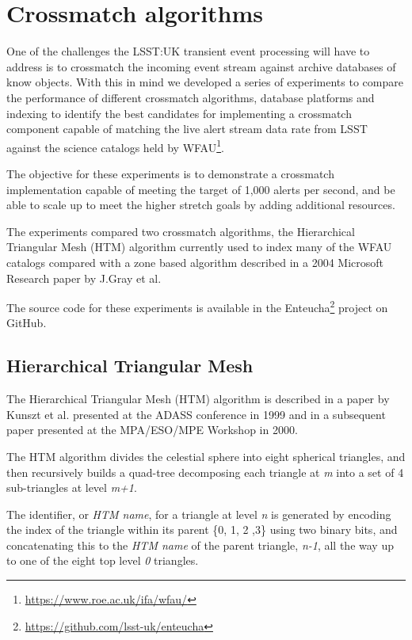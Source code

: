 \documentclass{article}
\newcommand{\enteucha} {Enteucha\xspace}
\newcommand{\github} {GitHub\xspace}
\newcommand{\crossmatch} {crossmatch\xspace}
\newcommand{\catalogs} {catalogs\xspace}
\newcommand{\lsst} {LSST\xspace}
\newcommand{\lsstuk} {LSST:UK\xspace}
\newcommand{\wfau} {WFAU\xspace}
\newcommand{\footurl}[1] {\footnote{\url{#1}}}
\begin{document}
\section{Crossmatch algorithms}
\label{crossmatch-algorithms}

One of the challenges the \lsstuk transient event processing will have to address is to \crossmatch the incoming event stream against archive databases of know objects. With this in mind we developed a series of experiments to compare the performance of different \crossmatch algorithms, database platforms and indexing to identify the best candidates for implementing a \crossmatch component capable of matching the live alert stream data rate from \lsst against the science \catalogs held by \wfau\footurl{https://www.roe.ac.uk/ifa/wfau/}.

The objective for these experiments is to demonstrate a \crossmatch implementation capable of meeting the target of 1,000 alerts per second, and be able to scale up to meet the higher stretch goals by adding additional resources.

The experiments compared two \crossmatch algorithms, the Hierarchical Triangular Mesh (HTM)
algorithm currently used to index many of the \wfau \catalogs compared with a zone based algorithm described in a 2004 Microsoft Research paper by J.Gray et al\cite{Gray-2004}.

The source code for these experiments is available in the \enteucha \footurl{https://github.com/lsst-uk/enteucha} project on \github.

\subsection{Hierarchical Triangular Mesh}
\label{crossmatch.htm}

The Hierarchical Triangular Mesh (HTM) algorithm is described in a paper by Kunszt et al. presented at the ADASS conference in 1999\cite{Kunszt-1999} and in a subsequent paper presented at the MPA/ESO/MPE Workshop in 2000\cite{Kunszt-2000}.

The HTM algorithm divides the celestial sphere into eight spherical triangles, and then recursively builds a quad-tree decomposing each triangle at \textit{m} into a set of 4 sub-triangles at level \textit{m+1}.

The identifier, or \textit{HTM name}, for a triangle at level \textit{n} is generated by encoding the index of the triangle within its parent \{0, 1, 2 ,3\}  using two binary bits, and concatenating this to the \textit{HTM name} of the parent triangle, \textit{n-1}, all the way up to one of the eight top level \textit{0} triangles.
\end{document}
